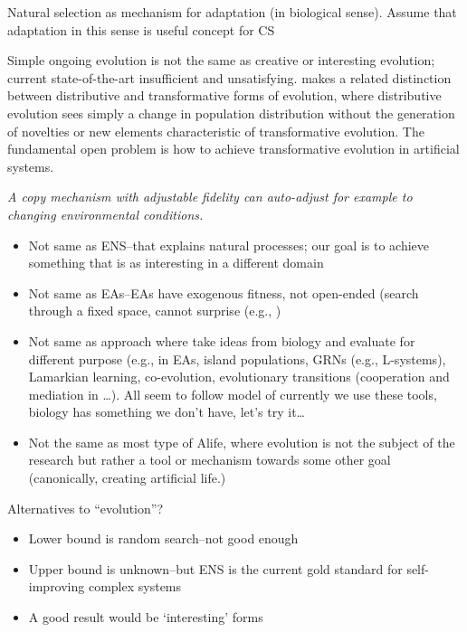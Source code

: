 Natural selection as mechanism for adaptation (in biological sense). Assume that adaptation in this sense is useful concept for CS

Simple ongoing evolution is not the same as creative or interesting evolution; current state-of-the-art insufficient and unsatisfying. \autocite{Bourrat2015} makes a related distinction between distributive and transformative forms of evolution, where distributive evolution sees simply a change in population distribution without the generation of novelties or new elements characteristic of transformative evolution. The fundamental open problem is how to achieve transformative evolution in artificial systems.

\emph{A copy mechanism with adjustable fidelity can auto-adjust for example to changing environmental conditions.}

\begin{itemize}
	\item
	      Not same as ENS--that explains natural processes; our goal is to achieve something that is as interesting in a different domain
	\item 
	      Not same as EAs--EAs have exogenous fitness, not open-ended (search through a fixed space, cannot surprise (e.g., \autocite{Nellis2014})
	\item  
	      Not same as approach where take ideas from biology and evaluate for different purpose (e.g., in EAs, island populations, GRNs (e.g., L-systems), Lamarkian learning, co-evolution, evolutionary transitions (cooperation and mediation in \autocite{Defaweux:2005fk}\ldots{}). All seem to follow model of currently we use these tools, biology has something we don't have, let's try it\ldots{}
	\item
	      Not the same as most type of Alife, where evolution is not the subject of the research but rather a tool or mechanism towards some other goal (canonically, creating artificial life.)
\end{itemize}

Alternatives to ``evolution''?

\begin{itemize}
	\item Lower bound is random search--not good enough
	\item Upper bound is unknown--but ENS is the current gold standard for self-improving complex systems
	\item A good result would be `interesting' forms
\end{itemize}

